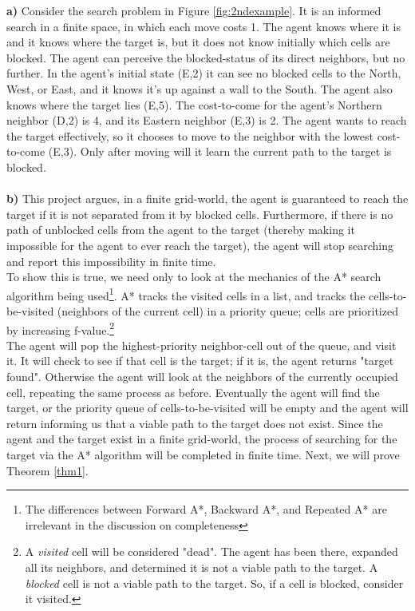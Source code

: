 \documentclass[titlepage]{article}
\begin{document}
    \noindent \textbf{a)} Consider the search problem in Figure \ref{fig:2ndexample}. It is an informed search in a finite space, in which each move costs 1. The agent knows where it is and it knows where the target is, but it does not know initially which cells are blocked. The agent can perceive the blocked-status of its direct neighbors, but no further. In the agent's initial state (E,2) it can see no blocked cells to the North, West, or East, and it knows it's up against a wall to the South. The agent also knows where the target lies (E,5). The cost-to-come for the agent's Northern neighbor (D,2) is 4, and its Eastern neighbor (E,3) is 2. The agent wants to reach the target effectively, so it chooses to move to the neighbor with the lowest cost-to-come (E,3). Only after moving will it learn the current path to the target is blocked. \\
    \\
    \noindent \textbf{b)} This project argues, in a finite grid-world, the agent is guaranteed to reach the target if it is not separated from it by blocked cells. Furthermore, if there is no path of unblocked cells from the agent to the target (thereby making it impossible for the agent to ever reach the target), the agent will stop searching and report this impossibility in finite time. \\
    \indent To show this is true, we need only to look at the mechanics of the A* search algorithm being used\footnote{The differences between Forward A*, Backward A*, and Repeated A* are irrelevant in the discussion on completeness}. A* tracks the visited cells in a list, and tracks the cells-to-be-visited (neighbors of the current cell) in a priority queue; cells are prioritized by increasing f-value.\footnote{A \emph{visited} cell will be considered "dead". The agent has been there, expanded all its neighbors, and determined it is not a viable path to the target. A \emph{blocked} cell is not a viable path to the target. So, if a cell is blocked, consider it visited.} \\
    \indent The agent will pop the highest-priority neighbor-cell out of the queue, and visit it. It will check to see if that cell is the target; if it is, the agent returns "target found". Otherwise the agent will look at the neighbors of the currently occupied cell, repeating the same process as before. Eventually the agent will find the target, or the priority queue of cells-to-be-visited will be empty and the agent will return informing us that a viable path to the target does not exist. Since the agent and the target exist in a finite grid-world, the process of searching for the target via the A* algorithm will be completed in finite time. Next, we will prove Theorem \ref{thm1}.
    
\end{document}
